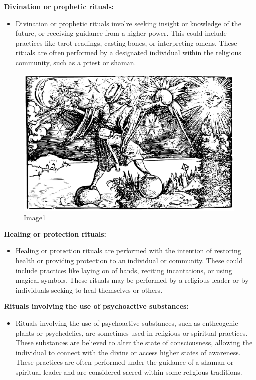 \textbf{Divination or prophetic rituals:}

\begin{itemize}
\tightlist
\item
  Divination or prophetic rituals involve seeking insight or knowledge
  of the future, or receiving guidance from a higher power. This could
  include practices like tarot readings, casting bones, or interpreting
  omens. These rituals are often performed by a designated individual
  within the religious community, such as a priest or shaman.
\end{itemize}

\begin{figure}
\centering
\includegraphics{./images/religion08.pdf}
\caption{Image1}
\end{figure}

\textbf{Healing or protection rituals:}

\begin{itemize}
\tightlist
\item
  Healing or protection rituals are performed with the intention of
  restoring health or providing protection to an individual or
  community. These could include practices like laying on of hands,
  reciting incantations, or using magical symbols. These rituals may be
  performed by a religious leader or by individuals seeking to heal
  themselves or others.
\end{itemize}

\textbf{Rituals involving the use of psychoactive substances:}

\begin{itemize}
\tightlist
\item
  Rituals involving the use of psychoactive substances, such as
  entheogenic plants or psychedelics, are sometimes used in religious or
  spiritual practices. These substances are believed to alter the state
  of consciousness, allowing the individual to connect with the divine
  or access higher states of awareness. These practices are often
  performed under the guidance of a shaman or spiritual leader and are
  considered sacred within some religious traditions.
\end{itemize}

